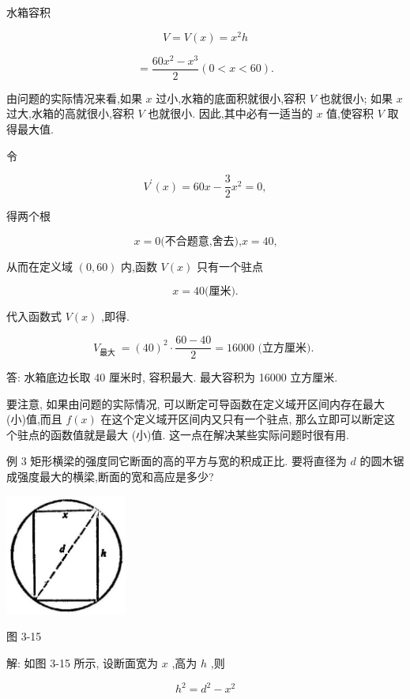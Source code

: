 \documentclass[10pt]{article}
\begin{document}
水箱容积

\[
V = V\left( x\right) = {x}^{2}h
\]

\[
= \frac{{60}{x}^{2} - {x}^{3}}{2}\left( {0 < x < {60}}\right) \text{.}
\]

由问题的实际情况来看,如果 \(x\) 过小,水箱的底面积就很小,容积 \(V\) 也就很小; 如果 \(x\) 过大,水箱的高就很小,容积 \(V\) 也就很小. 因此,其中必有一适当的 \(x\) 值,使容积 \(V\) 取得最大值.

令

\[
{V}^{\prime }\left( x\right) = {60x} - \frac{3}{2}{x}^{2} = 0,
\]

得两个根

\[
x = 0\text{(不合题意,舍去),}x = {40}\text{,}
\]

从而在定义域 \(\left( {0,{60}}\right)\) 内,函数 \(V\left( x\right)\) 只有一个驻点

\[
x = {40}\text{(厘米).}
\]

代入函数式 \(V\left( x\right)\) ,即得.

\[
{V}_{\text{最大 }} = {\left( {40}\right) }^{2} \cdot \frac{{60} - {40}}{2} = {16000}\text{ (立方厘米). }
\]

答: 水箱底边长取 40 厘米时, 容积最大. 最大容积为 16000 立方厘米.

要注意, 如果由问题的实际情况, 可以断定可导函数在定义域开区间内存在最大 (小)值,而且 \(f\left( x\right)\) 在这个定义域开区间内又只有一个驻点, 那么立即可以断定这个驻点的函数值就是最大 (小)值. 这一点在解决某些实际问题时很有用.

例 3 矩形横梁的强度同它断面的高的平方与宽的积成正比. 要将直径为 \(d\) 的圆木锯成强度最大的横梁,断面的宽和高应是多少?

\begin{center}
\includegraphics[max width=0.3\textwidth]{images/01912c18-5c3f-733d-b775-749ba9897a9d_150_941467.jpg}
\end{center}

图 3-15

解: 如图 3-15 所示, 设断面宽为 \(x\) ,高为 \(h\) ,则

\[
{h}^{2} = {d}^{2} - {x}^{2}
\]
\end{document}
